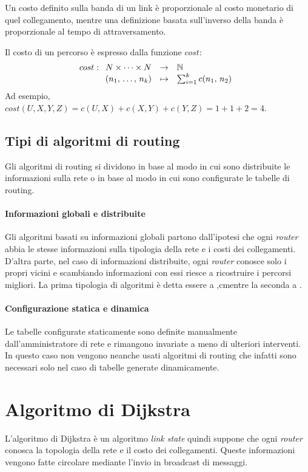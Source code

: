 \begin{note}
    Un costo definito sulla banda di un link è proporzionale al costo monetario
    di quel collegamento, mentre una definizione basata sull'inverso della banda
    è proporzionale al tempo di attraversamento.
\end{note}\noindent
Il costo di un percorso è espresso dalla funzione $cost$:
\[cost:\begin{array}[t]{ccl}
    N\times\dots\times N & \to & \mathbb{N}\\
    (n_1,\,\dots,\,n_k) & \mapsto & \sum_{i=1}^k c(n_1,\,n_2)
\end{array}\]
Ad esempio, $cost(U,X,Y,Z)=c(U,X)+c(X,Y)+c(Y,Z)=1+1+2=4$.

\subsection{Tipi di algoritmi di routing}
Gli algoritmi di routing si dividono in base al modo in cui sono distribuite le
informazioni sulla rete o in base al modo in cui sono configurate le tabelle di
routing.

\paragraph{Informazioni globali e distribuite}
Gli algoritmi basati su informazioni globali partono dall'ipotesi che ogni
\emph{router} abbia le stesse informazioni sulla tipologia della rete e i costi
dei collegamenti. D'altra parte, nel caso di informazioni distribuite, ogni
\emph{router} conosce solo i propri vicini e scambiando informazioni con essi
riesce a ricostruire i percorsi migliori. La prima tipologia di algoritmi è
detta essere a ,cmentre la seconda a
.

\paragraph{Configurazione statica e dinamica}
Le tabelle configurate staticamente sono definite manualmente
dall'amministratore di rete e rimangono invariate a meno di ulteriori interventi.
In questo caso non vengono neanche usati algoritmi di routing che infatti sono
necessari solo nel caso di tabelle generate dinamicamente.

\section{Algoritmo di Dijkstra}
L'algoritmo di Dijkstra è un algoritmo \emph{link state} quindi suppone che ogni
\emph{router} conosca la topologia della rete e il costo dei collegamenti.
Queste informazioni vengono fatte circolare mediante l'invio in broadcast di
messaggi.

